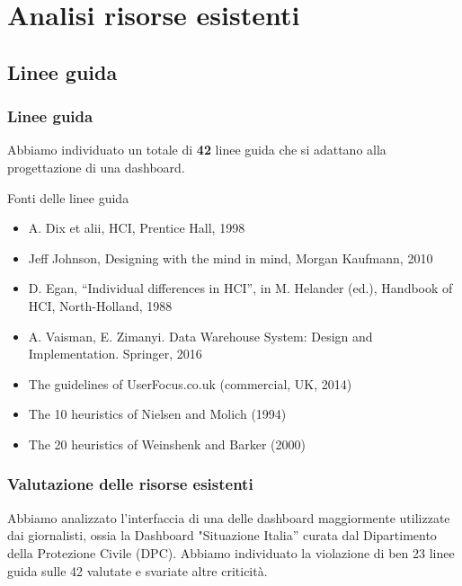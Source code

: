 \documentclass[handout]{beamer}
\begin{document}
	\section{Analisi risorse esistenti}
		\subsection{Linee guida}

			\begin{frame}
	 			\frametitle{Linee guida}
				Abbiamo individuato un totale di \textbf{42} linee guida che si adattano alla progettazione di una dashboard.
				\begin{block}{Fonti delle linee guida}
					\begin{itemize}[<+->]
						\item A. Dix et alii, HCI, Prentice Hall, 1998\\
						\item Jeff Johnson, Designing with the mind in mind, Morgan Kaufmann, 2010\\
						\item D. Egan, “Individual differences in HCI”, in M. Helander (ed.), Handbook of HCI, North-Holland, 1988\\
						\item A. Vaisman, E. Zimanyi. Data Warehouse System: Design and Implementation. Springer, 2016\\
						\item The guidelines of UserFocus.co.uk (commercial, UK, 2014)\\
						\item The 10 heuristics of Nielsen and Molich (1994)\\
						\item The 20 heuristics of Weinshenk and Barker (2000)\\
					\end{itemize}
				\end{block}
			\end{frame}
		
			\begin{frame}
				\frametitle{Valutazione delle risorse esistenti}
				Abbiamo analizzato l'interfaccia di una delle dashboard maggiormente utilizzate dai giornalisti, ossia la Dashboard "Situazione Italia'' curata dal Dipartimento della Protezione Civile (DPC). \newline \newline
				Abbiamo individuato la violazione di ben 23 linee guida sulle 42 valutate e svariate altre criticità. 
			\end{frame}
\end{document}
